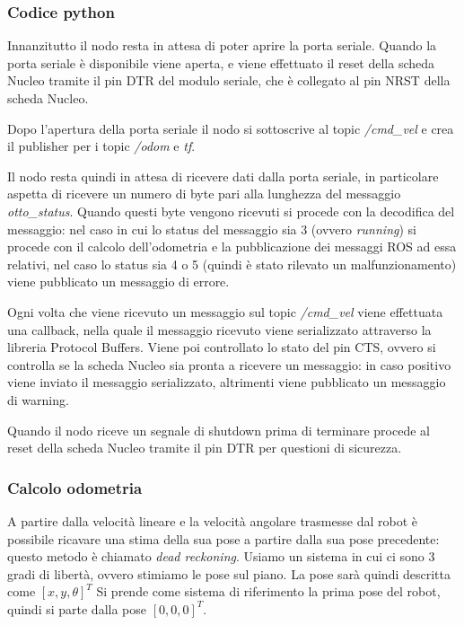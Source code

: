 \subsubsection{Codice python}
Innanzitutto il nodo resta in attesa di poter aprire la porta seriale. Quando la porta seriale è disponibile viene aperta, e viene effettuato il reset della scheda Nucleo tramite il pin DTR del modulo seriale, che è collegato al pin NRST della scheda Nucleo.

Dopo l'apertura della porta seriale il nodo si sottoscrive al topic \textit{/cmd\_vel} e crea il publisher per i topic \textit{/odom} e \textit{tf}.

Il nodo resta quindi in attesa di ricevere dati dalla porta seriale, in particolare aspetta di ricevere un numero di byte pari alla lunghezza del messaggio \textit{otto\_status}. Quando questi byte vengono ricevuti si procede con la decodifica del messaggio: nel caso in cui lo status del messaggio sia 3 (ovvero \textit{running}) si procede con il calcolo dell'odometria e la pubblicazione dei messaggi ROS ad essa relativi, nel caso lo status sia 4 o 5 (quindi è stato rilevato un malfunzionamento) viene pubblicato un messaggio di errore.

Ogni volta che viene ricevuto un messaggio sul topic \textit{/cmd\_vel} viene effettuata una callback, nella quale il messaggio ricevuto viene serializzato attraverso la libreria Protocol Buffers. Viene poi controllato lo stato del pin CTS, ovvero si controlla se la scheda Nucleo sia pronta a ricevere un messaggio: in caso positivo viene inviato il messaggio serializzato, altrimenti viene pubblicato un messaggio di warning.

Quando il nodo riceve un segnale di shutdown prima di terminare procede al reset della scheda Nucleo tramite il pin DTR per questioni di sicurezza.

\subsubsection{Calcolo odometria}
A partire dalla velocità lineare e la velocità angolare trasmesse dal robot è possibile ricavare una stima della sua pose a partire dalla sua pose precedente: questo metodo è chiamato \textit{dead reckoning}.
Usiamo un sistema in cui ci sono 3 gradi di libertà, ovvero stimiamo le pose sul piano. La pose sarà quindi descritta come $[x,y,\theta]^T$
Si prende come sistema di riferimento la prima pose del robot, quindi si parte dalla pose $[0,0,0]^T$.

